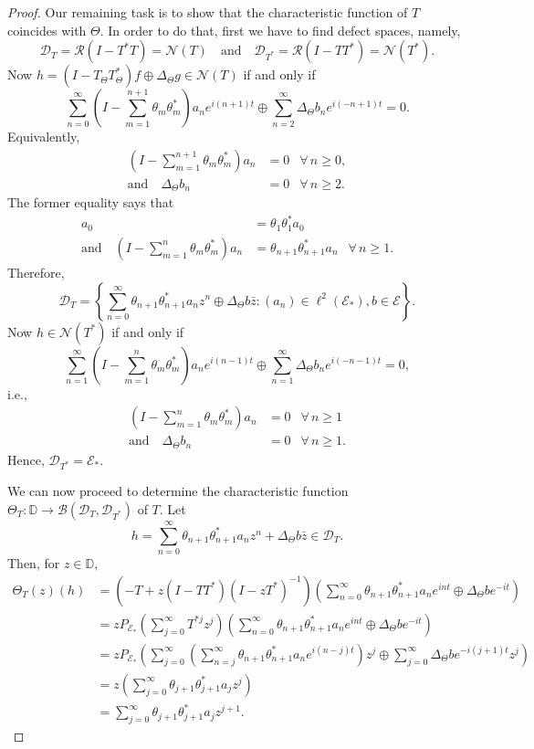 \documentclass[12pt]{amsart}
\newcommand{\clb}{\mathcal{B}}
\newcommand{\cle}{\mathcal{E}}
\newcommand{\cln}{\mathcal{N}}
\newcommand{\clr}{\mathcal{R}}
\newcommand{\D}{\mathbb{D}}
\newcommand{\E}{\mathcal{E}}
\theoremstyle{definition}
\theoremstyle{plain}
\theoremstyle{definition}
\numberwithin{equation}{section}
\begin{document}
\begin{proof}
Our remaining task is to show that the characteristic function of $T$ coincides with $\Theta$. In order to do that, first we have to find defect spaces, namely, 
\[
\mathcal{D}_T=\clr (I-T^*T)=\cln(T) \quad \mbox{and} \quad \mathcal{D}_{T^*}=\clr (I-TT^*)=\cln (T^*).
\]
Now $h=(I-T_\Theta T_\Theta^*)f\oplus\Delta_{\Theta} g\in \cln(T)$ if and only if
\[
\sum\limits_{n=0}^\infty \left(I- \sum\limits_{m=1}^{n+1}\theta_m\theta_m^*\right)a_ne^{i(n+1)t}\oplus\sum\limits_{n=2}^{\infty}\Delta_{\Theta}  b_ne^{i(-n+1)t}=0.
\]
Equivalently,
\begin{align*}
\left(I-\sum\limits_{m=1}^{n+1}\theta_m\theta_m^*\right)a_n & =0\,\, ~~ \forall \,n \geq 0,\\
\mbox{and} \quad 
\Delta_{\Theta} b_n & = 0\,\, ~~ \forall \,n \geq 2.
\end{align*}
The former equality says that 
\begin{align*}
a_0 & = \theta_1\theta_1^*a_0 \\
\mbox{and} \quad \left(I-\sum\limits_{m=1}^n \theta_m\theta_m^*\right)a_n & = \theta_{n+1}\theta_{n+1}^*a_n \,\, ~~  \forall \, n \geq 1.
\end{align*}
Therefore,
\[
\mathcal{D}_T=\left\{\sum\limits_{n=0}^\infty \theta_{n+1}\theta_{n+1}^*a_nz^n \oplus\Delta_{\Theta} b\bar{z}: (a_n) \in \ell^2(\E_*), b \in \E\right\}.
\]
Now $h \in \cln(T^*)$ if and only if 
\[
\sum\limits_{n=1}^\infty\left(I-\sum\limits_{m=1}^n \theta_m\theta_m^*\right)a_ne^{i(n-1)t}\oplus\sum\limits_{n=1}^{\infty}\Delta_{\Theta}b_n e^{i(-n-1)t}=0,
\] 
i.e.,
\begin{align*}
\left(I-\sum\limits_{m=1}^n \theta_m\theta_m^*\right)a_n & =0\,\, ~~ \forall \,n \geq 1 \\
\mbox{and} \quad 
\Delta_{\Theta}b_n & =0\,\, ~~ \forall \,n \geq 1.
\end{align*}
Hence, $\mathcal{D}_{T^*}=\cle_*$. 


We can now proceed to determine the characteristic function $\Theta_T:\D \rightarrow \clb(\mathcal{D}_T, \mathcal{D}_{T^*})$ of $T$.
Let 
\[
h=\sum\limits_{n=0}^\infty \theta_{n+1}\theta_{n+1}^*a_nz^n +\Delta_{\Theta}b\bar{z} \in \mathcal{D}_T.
\]
Then, for $z \in \D,$
\begin{align*}
\Theta_T( z)(h)&=\left(-T+ z(I-TT^*)(I- z T^*)^{-1}\right)\left(\sum\limits_{n=0}^\infty \theta_{n+1}\theta_{n+1}^*a_ne^{int} \oplus\Delta_{\Theta}be^{-it}\right)\\
&= z P_{\E_*}\left(\sum \limits_{j=0}^\infty  T^{*j}z^j\right)\left(\sum\limits_{n=0}^\infty \theta_{n+1}\theta_{n+1}^*a_ne^{int} \oplus\Delta_{\Theta}be^{-it}\right)\\
&=  z P_{\E_*}\left(\sum\limits_{j=0}^\infty  \left(\sum\limits_{n=j}^\infty \theta_{n+1}\theta_{n+1}^*a_ne^{i(n-j)t} \right) z^j   \oplus\sum\limits_{j=0}^\infty\Delta_{\Theta}be^{-i(j+1)t}z^j\right)\\
&= z\left(\sum\limits_{j=0}^\infty \theta_{j+1}\theta_{j+1}^*a_jz^j\right)\\
&= \sum\limits_{j=0}^\infty  \theta_{j+1}\theta_{j+1}^*a_jz^{j+1}.
\end{align*}



\end{proof}
\end{document}
